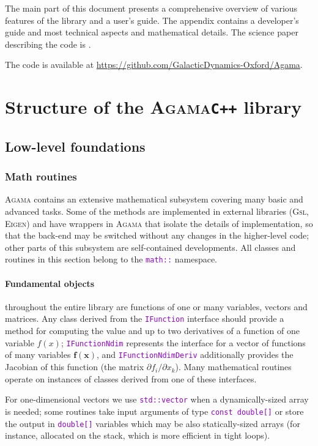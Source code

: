 \documentclass[12pt]{article}
\newcommand{\Agama}{\textsc{Agama}\xspace}
\newcommand{\Gsl}  {\textsc{Gsl}\xspace}
\newcommand{\Eigen}{\textsc{Eigen}\xspace}
\newcommand{\Cpp}  {\texttt{C++}\xspace}
\newcommand{\ttt}[1]{\textcolor{darkviolet}{\texttt{#1}}}
\newcommand{\D}{\partial}
\newcommand{\bx}{\boldsymbol{x}}
\let\oldparagraph\paragraph
\renewcommand{\paragraph}[1]{\vspace{-2mm}\oldparagraph{#1}}
\begin{document}
The main part of this document presents a comprehensive overview of various features of the library and a user's guide. The appendix contains a developer's guide and most technical aspects and mathematical details. The science paper describing the code is \cite{Vasiliev2019}.

The code is available at \url{https://github.com/GalacticDynamics-Oxford/Agama}.


\section{Structure of the \Agama \Cpp library}  \label{sec:Structure}

\subsection{Low-level foundations}

\subsubsection{Math routines}  \label{sec:Math}
\Agama contains an extensive mathematical subsystem covering many basic and advanced tasks. Some of the methods are implemented in external libraries (\Gsl, \Eigen) and have wrappers in \Agama that isolate the details of implementation, so that the back-end may be switched without any changes in the higher-level code; other parts of this subsystem are self-contained developments.
All classes and routines in this section belong to the \ttt{math::} namespace.

\paragraph{Fundamental objects}
throughout the entire library are functions of one or many variables, vectors and matrices.
Any class derived from the \ttt{IFunction} interface should provide a method for computing the value and up to two derivatives of a function of one variable $f(x)$; \ttt{IFunctionNdim} represents the interface for a vector of functions of many variables $\boldsymbol{f}(\bx)$, and \ttt{IFunctionNdimDeriv} additionally provides the Jacobian of this function (the matrix $\D f_i /\D x_k$). Many mathematical routines operate on instances of classes derived from one of these interfaces.

For one-dimensional vectors we use \ttt{std::vector} when a dynamically-sized array is needed; some routines take input arguments of type \ttt{const double[]} or store the output in \ttt{double[]} variables which may be also statically-sized arrays (for instance, allocated on the stack, which is more efficient in tight loops).
\end{document}
